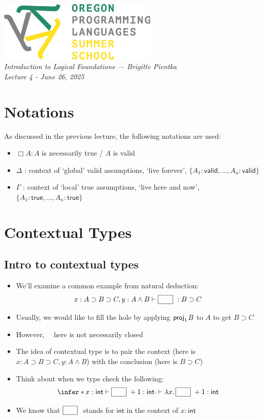 \documentclass[11pt]{article}
\newcommand{\valid}[1]{\ensuremath{#1 :\textsf{valid}}}
\newcommand{\true}[1]{\ensuremath{#1 :\textsf{true}}}
\newcommand{\projl}[1]{\ensuremath{\textsf{proj}_1\mkern2mu#1}}
\newcommand{\abs}[2]{\ensuremath{\lambda #1.\,#2}}
\newcommand{\hole}{\fbox{\rule{1.5em}{0pt}\rule{0pt}{0.6em}}\ }
\begin{document}
\thispagestyle{plain}
\begin{center}
\includegraphics[width=3in]{oplssLogo.png}\\[2\parskip]
\sffamily \LARGE \slshape Introduction to Logical Foundations
--- \upshape Brigitte Pientka \\[2ex]
\large Lecture 4 - \slshape June 26, 2025
\end{center}

\section{Notations}
As discussed in the previous lecture, the following notations are used:
\begin{itemize}
    \item $\Box A : A$ is necessarily true / $A$ is valid
    \item $\Delta$ : context of `global' valid assumptions, `live forever', $\{\valid{A_1},\ldots,\valid{A_n}\}$
    \item $\Gamma$ : context of `local' true assumptions, `live here and now', $\{\true{A_1},\ldots,\true{A_n}\}$
\end{itemize}

\section{Contextual Types}
\subsection{Intro to contextual types}
\begin{itemize}
    \item We'll examine a common example from natural deduction: \[x : A \supset B \supset C, y : A \land B \vdash \hole : B \supset C\]
    \item Usually, we would like to fill the hole by applying \projl{B} to $A$ to get $B \supset C$
    \item However, \hole \, here is not necessarily closed
    \item The idea of contextual type is to pair the context (here is $x : A \supset B \supset C, y : A \land B$) with the conclusion (here is $B \supset C$)
    \item Think about when we type check the following:
        \begin{equation}\label{ex1}
            \infer*{x : \textsf{int} \vdash \hole + 1: \textsf{int}}{\cdot \vdash \abs{x}{\hole + 1} : \textsf{int}}
        \end{equation}
    \item We know that $\hole$ stands for $\textsf{int}$ in the context of $x : \textsf{int}$
\end{itemize}
\end{document}
